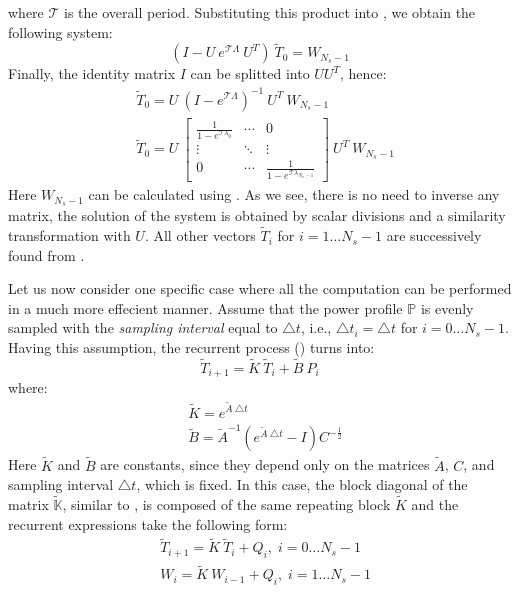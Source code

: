 where $\mathcal{T}$ is the overall period. Substituting this product into , we obtain the following system:
\[
  (I - U \: e^{\mathcal{T} \Lambda} \: U^T) \: \tilde{T}_0 = W_{N_s - 1}
\]
Finally, the identity matrix $I$ can be splitted into $U U^T$, hence:
\begin{align*}
  & \tilde{T}_0 = U \: (I - e^{\mathcal{T} \Lambda})^{-1} \: U^T \: W_{N_s - 1} \\
  & \tilde{T}_0 = U \: \left[
      \begin{array}{ccc}
        \frac{1}{1 - e^{\mathcal{T} \lambda_0}} & \cdots & 0 \\
        \vdots & \ddots & \vdots \\
        0 & \cdots & \frac{1}{1 - e^{\mathcal{T} \lambda_{N_n - 1}}}
      \end{array}
    \right] \: U^T \: W_{N_s - 1}
\end{align*}
Here $W_{N_s - 1}$ can be calculated using . As we see, there is no need to inverse any matrix, the solution of the system is obtained by scalar divisions and a similarity transformation with $U$. All other vectors $\tilde{T}_i$ for $i = 1 \dots N_s - 1$ are successively found from .

Let us now consider one specific case where all the computation can be performed in a much more effecient manner. Assume that the power profile $\mathbb{P}$ is evenly sampled with the \emph{sampling interval} equal to $\triangle t$, i.e., $\triangle t_i = \triangle t$ for $i = 0 \dots N_s - 1$. Having this assumption, the recurrent process () turns into:
\[
  \tilde{T}_{i+1} = \tilde{K} \: \tilde{T}_i + \tilde{B} \: P_i
\]
where:
\begin{align*}
  & \tilde{K} = e^{\tilde{A} \: \triangle t} \\
  & \tilde{B} = \tilde{A}^{-1} \left( e^{\tilde{A} \: \triangle t} - I \right) C^{-\frac{1}{2}}
\end{align*}
Here $\tilde{K}$ and $\tilde{B}$ are constants, since they depend only on the matrices $\tilde{A}$, $C$, and sampling interval $\triangle t$, which is fixed. In this case, the block diagonal of the matrix $\tilde{\mathbb{K}}$, similar to , is composed of the same repeating block $\tilde{K}$ and the recurrent expressions take the following form:
\begin{align}
  & \tilde{T}_{i + 1} = \tilde{K} \: \tilde{T}_i + Q_i, \; i = 0 \dots N_s - 1 \nonumber \\
  & W_i = \tilde{K} \: W_{i - 1} + Q_i, \; i = 1 \dots N_s - 1 \nonumber
\end{align}
